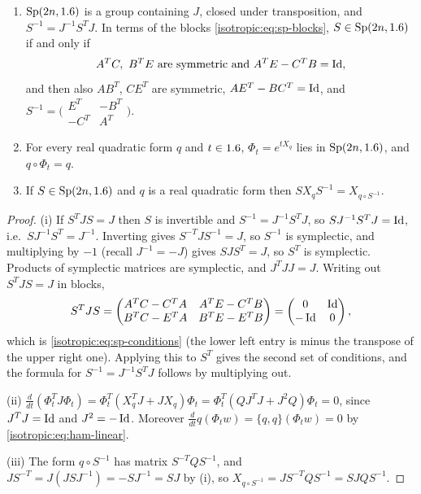 \begin{lemma}\label{isotropic:lem:sp-basic}
\begin{enumerate}[label=\textup{(\roman*)}]
\item $\mathrm{Sp}(2n,1.6)$ is a group containing $J$, closed under
  transposition, and $S^{-1}=J^{-1}S^TJ$. In terms of the blocks
  \eqref{isotropic:eq:sp-blocks}, $S\in\mathrm{Sp}(2n,1.6)$ if and only if
  \begin{equation}\label{isotropic:eq:sp-conditions}
    A^TC,\ B^TE\ \text{are symmetric and}\ A^TE-C^TB=\operatorname{Id} ,
  \end{equation}
  and then also $AB^T$, $CE^T$ are symmetric, $AE^T-BC^T=\operatorname{Id}$, and
  $S^{-1}=\bigl(\begin{smallmatrix}E^T&-B^T\\-C^T&A^T\end{smallmatrix}\bigr)$.
\item For every real quadratic form $q$ and $t\in1.6$, $\Phi_t=e^{tX_q}$ lies in
  $\mathrm{Sp}(2n,1.6)$, and $q\circ\Phi_t=q$.
\item If $S\in\mathrm{Sp}(2n,1.6)$ and $q$ is a real quadratic form then
  $SX_qS^{-1}=X_{q\circ S^{-1}}$.
\end{enumerate}
\end{lemma}
\begin{proof}
(i) If $S^TJS=J$ then $S$ is invertible and $S^{-1}=J^{-1}S^TJ$, so
$SJ^{-1}S^TJ=\operatorname{Id}$, i.e.\ $SJ^{-1}S^T=J^{-1}$. Inverting gives
$S^{-T}JS^{-1}=J$, so $S^{-1}$ is symplectic, and multiplying by $-1$ (recall
$J^{-1}=-J$) gives $SJS^T=J$, so $S^T$ is symplectic. Products of symplectic matrices are symplectic, and $J^TJJ=J$. Writing out
$S^TJS=J$ in blocks,
\begin{equation*}
  S^TJS=\begin{pmatrix}A^TC-C^TA&A^TE-C^TB\\B^TC-E^TA&B^TE-E^TB\end{pmatrix}
  =\begin{pmatrix}0&\operatorname{Id}\\-\operatorname{Id}&0\end{pmatrix},
\end{equation*}
which is \eqref{isotropic:eq:sp-conditions} (the lower left entry is minus the
transpose of the upper right one). Applying this to $S^T$ gives the second set of
conditions, and the formula for $S^{-1}=J^{-1}S^TJ$ follows by multiplying out.

(ii) $\frac{d}{dt}(\Phi_t^TJ\Phi_t)=\Phi_t^T(X_q^TJ+JX_q)\Phi_t=\Phi_t^T(QJ^TJ+J^2Q)\Phi_t=0$,
since $J^TJ=\operatorname{Id}$ and $J^2=-\operatorname{Id}$. Moreover
$\frac{d}{dt}q(\Phi_tw)=\{q,q\}(\Phi_tw)=0$ by \eqref{isotropic:eq:ham-linear}.

(iii) The form $q\circ S^{-1}$ has matrix $S^{-T}QS^{-1}$, and
$JS^{-T}=J(JSJ^{-1})=-SJ^{-1}=SJ$ by (i), so $X_{q\circ S^{-1}}=JS^{-T}QS^{-1}=SJQS^{-1}$.
\end{proof}

